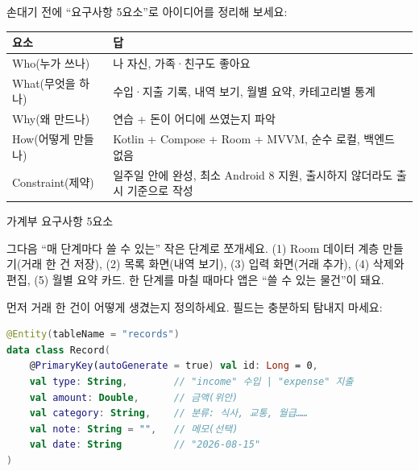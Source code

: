 


손대기 전에 “요구사항 5요소”로 아이디어를 정리해 보세요:

\begin{center}
\begin{tabularx}{\linewidth}{|X|X|}
\hline
\textbf{요소} & \textbf{답} \tabularnewline
\hline
Who(누가 쓰나) & 나 자신, 가족·친구도 좋아요 \tabularnewline
What(무엇을 하나) & 수입·지출 기록, 내역 보기, 월별 요약, 카테고리별 통계 \tabularnewline
Why(왜 만드나) & 연습 + 돈이 어디에 쓰였는지 파악 \tabularnewline
How(어떻게 만들나) & Kotlin + Compose + Room + MVVM, 순수 로컬, 백엔드 없음 \tabularnewline
Constraint(제약) & 일주일 안에 완성, 최소 Android 8 지원, 출시하지 않더라도 출시 기준으로 작성 \tabularnewline
\hline
\end{tabularx}
\end{center}

\begin{center}\small\color{gray}가계부 요구사항 5요소\end{center}

그다음 “매 단계마다 쓸 수 있는” 작은 단계로 쪼개세요. (1) Room 데이터 계층 만들기(거래 한 건 저장), (2) 목록 화면(내역 보기), (3) 입력 화면(거래 추가), (4) 삭제와 편집, (5) 월별 요약 카드. 한 단계를 마칠 때마다 앱은 “쓸 수 있는 물건”이 돼요.


먼저 거래 한 건이 어떻게 생겼는지 정의하세요. 필드는 충분하되 탐내지 마세요:

\begin{lstlisting}[language=Kotlin]
@Entity(tableName = "records")
data class Record(
    @PrimaryKey(autoGenerate = true) val id: Long = 0,
    val type: String,        // "income" 수입 | "expense" 지출
    val amount: Double,      // 금액(위안)
    val category: String,    // 분류: 식사, 교통, 월급……
    val note: String = "",   // 메모(선택)
    val date: String         // "2026-08-15"
)
\end{lstlisting}

